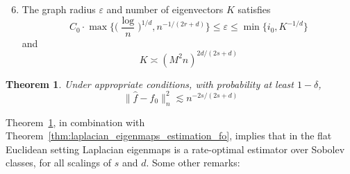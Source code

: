 \documentclass{article}
\newcommand{\1}{\mathbf{1}}
\newcommand{\wh}[1]{\widehat{#1}}
\theoremstyle{alden}
\theoremstyle{aldenthm}
\newtheorem{theorem}{Theorem}
\theoremstyle{definition}
\theoremstyle{remark}
\begin{document}
\begin{enumerate}[label=(A\arabic*)]
	\setcounter{enumi}{5}
	\item 
	The graph radius $\varepsilon$ and number of eigenvectors $K$ satisfies
	\begin{equation*}
	C_0 \cdot \max\biggl\{\biggl(\frac{\log}{n}\biggr)^{1/d}, n^{-1/(2r + d)}\biggr\} \leq \varepsilon \leq \min\{i_0, K^{-1/d}\}
	\end{equation*}
	and
	\begin{equation*}
	K \asymp (M^2n)^{2d/(2s + d)}
	\end{equation*}
\end{enumerate}

\begin{theorem}
	\label{thm:laplacian_eigenmaps_estimation_ho}
	Under appropriate conditions, with probability at least $1 - \delta$,
	\begin{equation}
	\label{eqn:laplacian_eigenmaps_estimation_ho}
	\|\wh{f} - f_0\|_n^2 \lesssim n^{-2s/(2s + d)}
	\end{equation}
\end{theorem}
Theorem~\ref{thm:laplacian_eigenmaps_estimation_ho}, in combination with Theorem~\ref{thm:laplacian_eigenmaps_estimation_fo}, implies that in the flat Euclidean setting Laplacian eigenmaps is a rate-optimal estimator over Sobolev classes, for all scalings of $s$ and $d$. Some other remarks:
\end{document}
